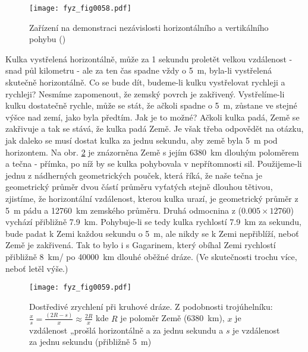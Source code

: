     \begin{figure}[ht!]  %
      \centering
      \texttt{[image: fyz\_fig0058.pdf]}
      \caption{Zařízení na demonstraci nezávislosti horizontálního a vertikálního pohybu 
               (\cite[s.~96]{Feynman01})}
      \label{fyz:fig0058}
    \end{figure}
    Kulka vystřelená horizontálně, může za \num{1} sekundu proletět velkou vzdálenost - snad půl 
    kilometru - ale za ten čas spadne vždy o \qty{5}{\m}, byla-li vystřelená skutečně horizontálně. 
    Co se bude dít, budeme-li kulku vystřelovat rychleji a rychleji? Nesmíme zapomenout, že zemský 
    povrch je zakřivený. Vystřelíme-li kulku dostatečně rychle, může se stát, že ačkoli spadne o 
    \qty{5}{\m}, zůstane ve stejné výšce nad zemí, jako byla předtím. Jak je to možné? Ačkoli kulka 
    padá, Země se zakřivuje a tak se stává, že kulka padá  Země. Je však třeba odpovědět 
    na otázku, jak daleko se musí dostat kulka za jednu sekundu, aby země byla \qty{5}{\m} pod 
    horizontem. Na obr. \ref{fyz:fig0059} je znázorněna Země s jejím \qty{6380}{\km} dlouhým 
    poloměrem a tečna - přímka, po níž by se kulka pohybovala v nepřítomnosti sil. Použijeme-li 
    jednu z nádherných geometrických pouček, která říká, že naše tečna je geometrický průměr dvou 
    částí průměru vyťatých stejně dlouhou tětivou, zjistíme, že horizontální vzdálenost, kterou 
    kulka urazí, je geometrický průměr z \qty{5}{\m} pádu a \qty{12760}{\km} zemského průměru. Druhá 
    odmocnina z (\(\num{0.005}\times\num{12760}\)) vychází přibližně \qty{7.9}{\km}. Pohybuje-li se 
    tedy kulka rychlostí \qty{7.9}{\km} za sekundu, bude padat k Zemi každou sekundu o \qty{5}{\m}, 
    ale nikdy se k Zemi nepřiblíží, neboť Země je zakřivená. Tak to bylo i s Gagarinem, který 
    obíhal Zemi rychlostí přibližně \qty{8}{\km/\sec} po \qty{40000}{\km} dlouhé oběžné dráze. (Ve 
    skutečnosti trochu více, neboť letěl výše.)

    \begin{figure}[ht!]  %
      \centering
      \texttt{[image: fyz\_fig0059.pdf]}
      \caption{Dostředivé zrychlení při kruhové dráze. Z podobnosti trojúhelníku: \(\frac{x}{s} = 
               \frac{(2R - s)}{x} \approx \frac{2R}{x}\) kde \(R\) je poloměr Země             
               (\qty{6380}{\km}), \(x\) je vzdálenost „prošlá horizontálně a za jednu sekundu a
               \(s\) je vzdálenost  za jednu sekundu (přibližně \qty{5}{\m})
               \cite[s.~97]{Feynman01}}
       \label{fyz:fig0059}
    \end{figure}
    

